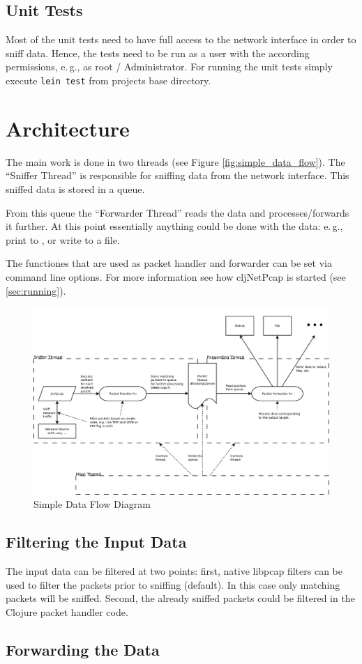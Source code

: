 \documentclass[11pt,a4paper,parskip=half]{scrartcl}
\newcommand{\programname}{{cljNetPcap}}
\begin{document}
\subsection{Unit Tests}
Most of the unit tests need to have full access to the network interface in order to sniff data.
Hence, the tests need to be run as a user with the according permissions, e.\,g., as root / Administrator.
For running the unit tests simply execute \texttt{lein test} from projects base directory.

\section{Architecture}
The main work is done in two threads (see Figure \vref{fig:simple_data_flow}).
The ``Sniffer Thread'' is responsible for sniffing data from the network interface.
This sniffed data is stored in a queue.

From this queue the ``Forwarder Thread'' reads the data and processes/forwards it further.
At this point essentially anything could be done with the data:
e.\,g., print to , or write to a file.

The functiones that are used as packet handler and forwarder can be set via command line options.
For more information see how \programname{} is started (see \vref{sec:running}).

\begin{figure} 
  \centering
  \includegraphics[width=\textwidth]{diagrams/simple_data_flow}
  \caption{Simple Data Flow Diagram}
  \label{fig:simple_data_flow}
\end{figure}

\subsection{Filtering the Input Data}
The input data can be filtered at two points:
first, native libpcap filters can be used to filter the packets prior to sniffing (default).
In this case only matching packets will be sniffed.
Second, the already sniffed packets could be filtered in the Clojure packet handler code.

\subsection{Forwarding the Data}

{}

\end{document}
